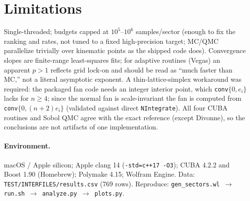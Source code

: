 \documentclass[11pt,a4paper]{article}
\begin{document}
\section{Limitations}
Single-threaded; budgets capped at $10^5$--$10^6$ samples/sector (enough to fix
the ranking and rates, not tuned to a fixed high-precision target; MC/QMC
parallelize trivially over kinematic points as the shipped code does).
Convergence slopes are finite-range least-squares fits; for adaptive routines
(Vegas) an apparent $p>1$ reflects grid lock-on and should be read as ``much
faster than MC,'' not a literal asymptotic exponent. A thin-lattice-simplex
workaround was required: the packaged fan code needs an integer interior point,
which \texttt{conv}$\{0,e_i\}$ lacks for $n\ge4$; since the normal fan is
scale-invariant the fan is computed from \texttt{conv}$\{0,(n{+}2)e_i\}$
(validated against direct \texttt{NIntegrate}). All four CUBA routines and Sobol
QMC agree with the exact reference (except Divonne), so the conclusions are not
artifacts of one implementation.

\paragraph{Environment.} macOS / Apple silicon; Apple clang 14
(\texttt{-std=c++17 -O3}); CUBA 4.2.2 and Boost 1.90 (Homebrew); Polymake 4.15;
Wolfram Engine. Data: \texttt{TEST/INTERFILES/results.csv} (769 rows).
Reproduce: \texttt{gen\_sectors.wl $\to$ run.sh $\to$ analyze.py $\to$ plots.py}.
\end{document}
